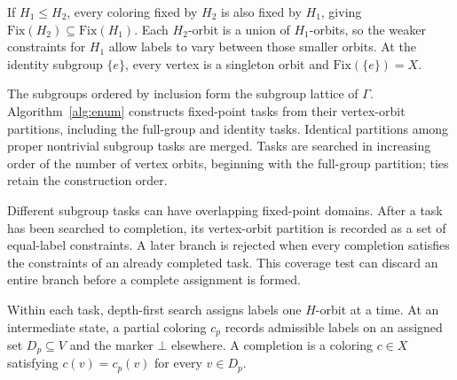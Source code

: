 \documentclass[a5paper, 10pt]{article}
\begin{document}
If $H_1\leq H_2$, every coloring fixed by $H_2$ is also fixed by $H_1$, giving $\mathrm{Fix}(H_2)\subseteq\mathrm{Fix}(H_1)$. Each $H_2$-orbit is a union of $H_1$-orbits, so the weaker constraints for $H_1$ allow labels to vary between those smaller orbits. At the identity subgroup $\{e\}$, every vertex is a singleton orbit and $\mathrm{Fix}(\{e\})=X$.

The subgroups ordered by inclusion form the subgroup lattice of $\Gamma$. Algorithm~\ref{alg:enum} constructs fixed-point tasks from their vertex-orbit partitions, including the full-group and identity tasks. Identical partitions among proper nontrivial subgroup tasks are merged. Tasks are searched in increasing order of the number of vertex orbits, beginning with the full-group partition; ties retain the construction order.

Different subgroup tasks can have overlapping fixed-point domains. After a task has been searched to completion, its vertex-orbit partition is recorded as a set of equal-label constraints. A later branch is rejected when every completion satisfies the constraints of an already completed task. This coverage test can discard an entire branch before a complete assignment is formed.

Within each task, depth-first search assigns labels one $H$-orbit at a time. At an intermediate state, a partial coloring $c_p$ records admissible labels on an assigned set $D_p\subseteq V$ and the marker $\bot$ elsewhere. A completion is a coloring $c\in X$ satisfying $c(v)=c_p(v)$ for every $v\in D_p$.
\end{document}
